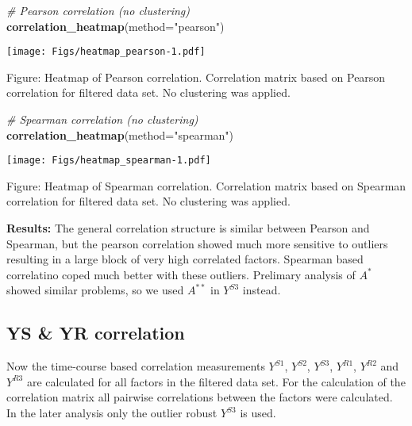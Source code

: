 \documentclass[]{article}
\newenvironment{Shaded}{\begin{snugshade}}{\end{snugshade}}
\newcommand{\KeywordTok}[1]{\textcolor[rgb]{0.13,0.29,0.53}{\textbf{{#1}}}}
\newcommand{\DataTypeTok}[1]{\textcolor[rgb]{0.13,0.29,0.53}{{#1}}}
\newcommand{\StringTok}[1]{\textcolor[rgb]{0.31,0.60,0.02}{{#1}}}
\newcommand{\CommentTok}[1]{\textcolor[rgb]{0.56,0.35,0.01}{\textit{{#1}}}}
\newcommand{\NormalTok}[1]{{#1}}
\begin{document}
\begin{Shaded}
\begin{Highlighting}[]
\CommentTok{# Pearson correlation (no clustering)}
\KeywordTok{correlation_heatmap}\NormalTok{(}\DataTypeTok{method=}\StringTok{"pearson"}\NormalTok{)}
\end{Highlighting}
\end{Shaded}

\texttt{[image: Figs/heatmap\_pearson-1.pdf]}

Figure: Heatmap of Pearson correlation. Correlation matrix based on
Pearson correlation for filtered data set. No clustering was applied.

\begin{Shaded}
\begin{Highlighting}[]
\CommentTok{# Spearman correlation (no clustering)}
\KeywordTok{correlation_heatmap}\NormalTok{(}\DataTypeTok{method=}\StringTok{"spearman"}\NormalTok{)}
\end{Highlighting}
\end{Shaded}

\texttt{[image: Figs/heatmap\_spearman-1.pdf]}

Figure: Heatmap of Spearman correlation. Correlation matrix based on
Spearman correlation for filtered data set. No clustering was applied.

\textbf{Results:} The general correlation structure is similar between
Pearson and Spearman, but the pearson correlation showed much more
sensitive to outliers resulting in a large block of very high correlated
factors. Spearman based correlatino coped much better with these
outliers. Prelimary analysis of \(A^{*}\) showed similar problems, so we
used \(A^{**}\) in \(Y^{S3}\) instead.

\subsection{YS \& YR correlation}\label{ys-yr-correlation}

Now the time-course based correlation measurements \(Y^{S1}\),
\(Y^{S2}\), \(Y^{S3}\), \(Y^{R1}\), \(Y^{R2}\) and \(Y^{R3}\) are
calculated for all factors in the filtered data set. For the calculation
of the correlation matrix all pairwise correlations between the factors
were calculated. In the later analysis only the outlier robust
\(Y^{S3}\) is used.
\end{document}
